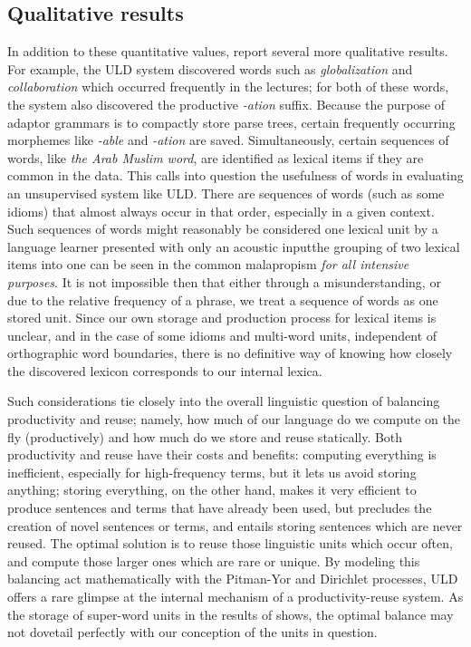 \documentclass[12pt,letterpaper]{article}
\begin{document}
\subsection{Qualitative results}
In addition to these quantitative values, \citet{lee:2015} report several more qualitative results. For example, the ULD system discovered words such as \textit{globalization} and \textit{collaboration} which occurred frequently in the lectures; for both of these words, the system also discovered the productive \textit{-ation} suffix. Because the purpose of adaptor grammars is to compactly store parse trees, certain frequently occurring morphemes like \textit{-able} and \textit{-ation} are saved. Simultaneously, certain sequences of words, like \textit{the Arab Muslim word}, are identified as lexical items if they are common in the data. This calls into question the usefulness of words in evaluating an unsupervised system like ULD. There are sequences of words (such as some idioms) that almost always occur in that order, especially in a given context. Such sequences of words might reasonably be considered one lexical unit by a language learner presented with only an acoustic input\textemdash  the grouping of two lexical items into one can be seen in the common malapropism \textit{for all intensive purposes}. It is not impossible then that either through a misunderstanding, or due to the relative frequency of a phrase, we treat a sequence of words as one stored unit. Since our own storage and production process for lexical items is unclear, and in the case of some idioms and multi-word units, independent of orthographic word boundaries, there is no definitive way of knowing how closely the discovered lexicon corresponds to our internal lexica. 

Such considerations tie closely into the overall linguistic question of balancing productivity and reuse; namely, how much of our language do we compute on the fly (productively) and how much do we store and reuse statically. Both productivity and reuse have their costs and benefits: computing everything is inefficient, especially for high-frequency terms, but it lets us avoid storing anything; storing everything, on the other hand, makes it very efficient to produce sentences and terms that have already been used, but precludes the creation of novel sentences or terms, and entails storing sentences which are never reused. The optimal solution is to reuse those linguistic units which occur often, and compute those larger ones which are rare or unique. By modeling this balancing act mathematically with the Pitman-Yor and Dirichlet processes, ULD offers a rare glimpse at the internal mechanism of a productivity-reuse system. As the storage of super-word units in the results of \citet{lee:2015} shows, the optimal balance may not dovetail perfectly with our conception of the units in question. 
\end{document}
